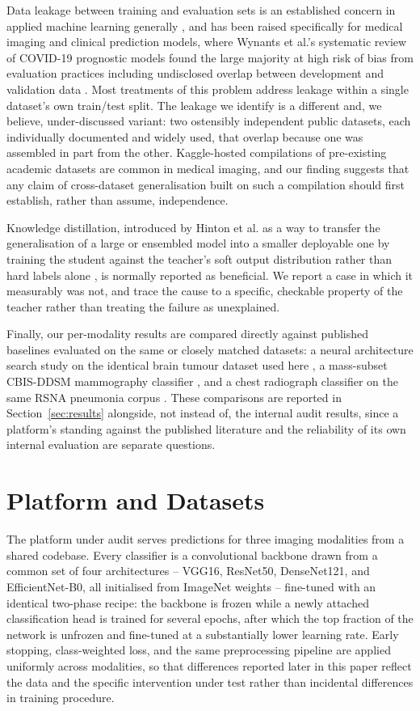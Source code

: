 \documentclass[conference]{IEEEtran}
\begin{document}
Data leakage between training and evaluation sets is an established concern in applied machine learning generally \cite{kaufman2012leakage}, and has been raised specifically for medical imaging and clinical prediction models, where Wynants et al.'s systematic review of COVID-19 prognostic models found the large majority at high risk of bias from evaluation practices including undisclosed overlap between development and validation data \cite{wynants2020}. Most treatments of this problem address leakage within a single dataset's own train/test split. The leakage we identify is a different and, we believe, under-discussed variant: two ostensibly independent public datasets, each individually documented and widely used, that overlap because one was assembled in part from the other. Kaggle-hosted compilations of pre-existing academic datasets are common in medical imaging, and our finding suggests that any claim of cross-dataset generalisation built on such a compilation should first establish, rather than assume, independence.

Knowledge distillation, introduced by Hinton et al. as a way to transfer the generalisation of a large or ensembled model into a smaller deployable one by training the student against the teacher's soft output distribution rather than hard labels alone \cite{hinton2015}, is normally reported as beneficial. We report a case in which it measurably was not, and trace the cause to a specific, checkable property of the teacher rather than treating the failure as unexplained.

Finally, our per-modality results are compared directly against published baselines evaluated on the same or closely matched datasets: a neural architecture search study on the identical brain tumour dataset used here \cite{zhang2022}, a mass-subset CBIS-DDSM mammography classifier \cite{jaamour2024}, and a chest radiograph classifier on the same RSNA pneumonia corpus \cite{valluri2023}. These comparisons are reported in Section~\ref{sec:results} alongside, not instead of, the internal audit results, since a platform's standing against the published literature and the reliability of its own internal evaluation are separate questions.

\section{Platform and Datasets}

The platform under audit serves predictions for three imaging modalities from a shared codebase. Every classifier is a convolutional backbone drawn from a common set of four architectures -- VGG16, ResNet50, DenseNet121, and EfficientNet-B0, all initialised from ImageNet weights -- fine-tuned with an identical two-phase recipe: the backbone is frozen while a newly attached classification head is trained for several epochs, after which the top fraction of the network is unfrozen and fine-tuned at a substantially lower learning rate. Early stopping, class-weighted loss, and the same preprocessing pipeline are applied uniformly across modalities, so that differences reported later in this paper reflect the data and the specific intervention under test rather than incidental differences in training procedure.
\end{document}
